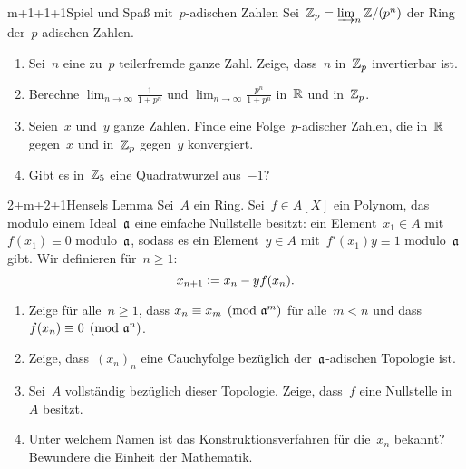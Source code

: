 \documentclass[entwurf]{uebblatt}
\begin{document}

\begin{aufgabe}{m+1+1+1}{Spiel und Spaß mit~$p$-adischen Zahlen}
Sei~$\mathbb{Z}_p = \varinjlim_n \mathbb{Z}/(p^n)$ der Ring der~$p$-adischen Zahlen.
\begin{enumerate}
\item Sei~$n$ eine zu~$p$ teilerfremde ganze Zahl. Zeige, dass~$n$ in~$\mathbb{Z}_p$
invertierbar ist.
\item Berechne $\lim_{n \to \infty} \frac{1}{1 + p^n}$ und $\lim_{n \to \infty}
\frac{p^n}{1 + p^n}$ in~$\mathbb{R}$ und in~$\mathbb{Z}_p$.
\item Seien~$x$ und~$y$ ganze Zahlen. Finde eine Folge~$p$-adischer Zahlen, die
in~$\mathbb{R}$ gegen~$x$ und in~$\mathbb{Z}_p$ gegen~$y$ konvergiert.
\item Gibt es in~$\mathbb{Z}_5$ eine Quadratwurzel aus~$-1$?
\end{enumerate}
\end{aufgabe}

\begin{aufgabe}{2+m+2+1}{Hensels Lemma}
Sei~$A$ ein Ring. Sei~$f \in A[X]$ ein
Polynom, das modulo einem Ideal~$\mathfrak{a}$ eine einfache Nullstelle besitzt: ein Element~$x_1
\in A$ mit~$f(x_1) \equiv 0$ modulo~$\mathfrak{a}$, sodass es ein Element~$y \in A$
mit~$f'(x_1) y \equiv 1$ modulo~$\mathfrak{a}$ gibt.
Wir definieren für~$n \geq 1$: \[ x_{n+1} \vcentcolon= x_n - y f(x_n). \]
\begin{enumerate}
\item Zeige für alle~$n \geq 1$, dass $x_n \equiv x_m \pmod{\mathfrak{a}^m}$ für
alle~$m < n$ und dass~$f(x_n) \equiv 0 \pmod{\mathfrak{a}^n}$.
\item Zeige, dass~$(x_n)_n$ eine Cauchyfolge bezüglich der~$\mathfrak{a}$-adischen
Topologie ist.
\item Sei~$A$ vollständig bezüglich dieser Topologie. Zeige,
dass~$f$ eine Nullstelle in~$A$ besitzt.
\item Unter welchem Namen ist das Konstruktionsverfahren für die~$x_n$ bekannt?
Bewundere die Einheit der Mathematik.
\end{enumerate}
\end{aufgabe}
\end{document}
